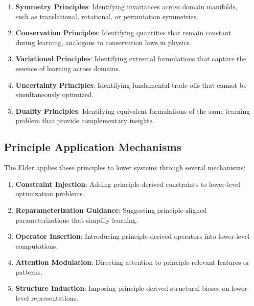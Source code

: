 \begin{enumerate}
\item \textbf{Symmetry Principles}: Identifying invariances across domain manifolds, such as translational, rotational, or permutation symmetries.

\item \textbf{Conservation Principles}: Identifying quantities that remain constant during learning, analogous to conservation laws in physics.

\item \textbf{Variational Principles}: Identifying extremal formulations that capture the essence of learning across domains.

\item \textbf{Uncertainty Principles}: Identifying fundamental trade-offs that cannot be simultaneously optimized.

\item \textbf{Duality Principles}: Identifying equivalent formulations of the same learning problem that provide complementary insights.
\end{enumerate}

\subsection{Principle Application Mechanisms}

The Elder applies these principles to lower systems through several mechanisms:

\begin{enumerate}
\item \textbf{Constraint Injection}: Adding principle-derived constraints to lower-level optimization problems.

\item \textbf{Reparameterization Guidance}: Suggesting principle-aligned parameterizations that simplify learning.

\item \textbf{Operator Insertion}: Introducing principle-derived operators into lower-level computations.

\item \textbf{Attention Modulation}: Directing attention to principle-relevant features or patterns.

\item \textbf{Structure Induction}: Imposing principle-derived structural biases on lower-level representations.
\end{enumerate}


